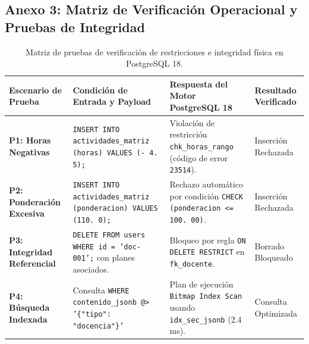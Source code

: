 \documentclass[12pt,a4paper]{article}
\begin{document}
\subsection*{Anexo 3: Matriz de Verificación Operacional y Pruebas de Integridad}
\begin{table}[H]
\centering
\small
\renewcommand{\arraystretch}{1.15}
\begin{tabularx}{\textwidth}{|>{\hsize=0.75\hsize\raggedright\arraybackslash\bfseries\footnotesize}X|>{\hsize=1.25\hsize\raggedright\arraybackslash\footnotesize}X|>{\hsize=1.35\hsize\raggedright\arraybackslash\footnotesize}X|>{\hsize=0.65\hsize\centering\arraybackslash\footnotesize}X|}
\hline
\rowcolor{tableheader}
\textbf{Escenario de Prueba} & \textbf{Condición de Entrada y Payload} & \textbf{Respuesta del Motor PostgreSQL 18} & \textbf{Resultado Verificado} \\
\hline
P1: Horas Negativas & \texttt{INSERT INTO actividades\_\allowbreak  matriz (horas) VALUES (- 4. 5);} & Violación de restricción \texttt{chk\_\allowbreak  horas\_\allowbreak  rango} (código de error \texttt{23514}). & Inserción Rechazada \\
\hline
P2: Ponderación Excesiva & \texttt{INSERT INTO actividades\_\allowbreak  matriz (ponderacion) VALUES (110. 0);} & Rechazo automático por condición \texttt{CHECK (ponderacion <= 100. 00)}. & Inserción Rechazada \\
\hline
P3: Integridad Referencial & \texttt{DELETE FROM users WHERE id = 'doc- 001';} con planes asociados. & Bloqueo por regla \texttt{ON DELETE RESTRICT} en \texttt{fk\_\allowbreak  docente}. & Borrado Bloqueado \\
\hline
P4: Búsqueda Indexada & Consulta \texttt{WHERE contenido\_\allowbreak  jsonb @> '\{"tipo": "docencia"\}'} & Plan de ejecución \texttt{Bitmap Index Scan} usando \texttt{idx\_\allowbreak  sec\_\allowbreak  jsonb} (2.4 ms). & Consulta Optimizada \\
\hline
\end{tabularx}
\caption{Matriz de pruebas de verificación de restricciones e integridad física en PostgreSQL 18.}
\end{table}
\end{document}
